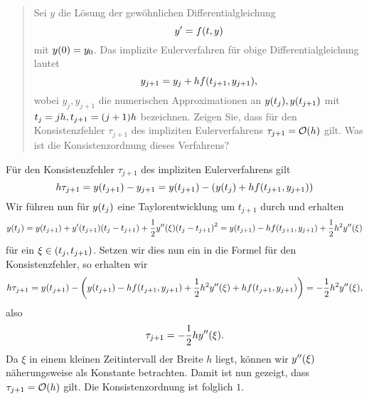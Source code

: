 \documentclass{exercise}
\begin{document}
	\section{}

	\begin{quote}
		Sei \(y\) die Lösung der gewöhnlichen Differentialgleichung
		\[
			y' = f\parentheses*{t, y}
		\]
		mit \(y\parentheses*{0} = y_0\).
		Das implizite Eulerverfahren für obige Differentialgleichung lautet
		\[
			y_{j + 1} = y_j + hf\parentheses*{t_{j + 1}, y_{j + 1}},
		\]
		wobei \(y_j, y_{j + 1}\) die numerischen Approximationen an \(y\parentheses*{t_j}, y\parentheses*{t_{j + 1}}\) mit \(t_j = jh, t_{j + 1} = \parentheses*{j + 1}h\) bezeichnen.
		Zeigen Sie, dass für den Konsistenzfehler \(\tau_{j + 1}\) des impliziten Eulerverfahrens \(\tau_{j + 1} = \mathcal{O}\parentheses*{h}\) gilt.
		Was ist die Konsistenzordnung dieses Verfahrens?
	\end{quote}

	Für den Konsistenzfehler \(\tau_{j + 1}\) des impliziten Eulerverfahrens gilt
	\[
		h\tau_{j + 1} = y\parentheses*{t_{j + 1}} - y_{j + 1} = y\parentheses*{t_{j + 1}} - \parentheses*{y\parentheses*{t_j} + hf\parentheses*{t_{j + 1}, y_{j + 1}}}
	\]
	Wir führen nun für \(y\parentheses*{t_j}\) eine Taylorentwicklung um \(t_{j + 1}\) durch und erhalten
	\[
		y\parentheses*{t_j} = y\parentheses*{t_{j + 1}} + y'\parentheses*{t_{j + 1}}\parentheses*{t_j - t_{j + 1}} + \frac{1}{2}y''\parentheses*{\xi}\parentheses*{t_j - t_{j + 1}}^2 = y\parentheses*{t_{j + 1}} - hf\parentheses*{t_{j + 1}, y_{j + 1}} + \frac{1}{2}h^2 y''\parentheses*{\xi}
	\]
	für ein \(\xi \in \parentheses*{t_j, t_{j + 1}}\).
	Setzen wir dies nun ein in die Formel für den Konsistenzfehler, so erhalten wir
	\[
		h\tau_{j + 1} = y\parentheses*{t_{j + 1}} - \parentheses*{y\parentheses*{t_{j + 1}} - hf\parentheses*{t_{j + 1}, y_{j + 1}} + \frac{1}{2}h^2 y''\parentheses*{\xi} + hf\parentheses*{t_{j + 1}, y_{j + 1}}} = -\frac{1}{2}h^2 y''\parentheses*{\xi},
	\]
	also
	\[
		\tau_{j + 1} = -\frac{1}{2}hy''\parentheses*{\xi}.
	\]
	Da \(\xi\) in einem kleinen Zeitintervall der Breite \(h\) liegt, können wir \(y''\parentheses*{\xi}\) näherungsweise als Konstante betrachten. Damit ist nun gezeigt, dass \(\tau_{j + 1} = \mathcal{O}\parentheses*{h}\) gilt. Die Konsistenzordnung ist folglich \(1\).
\end{document}
